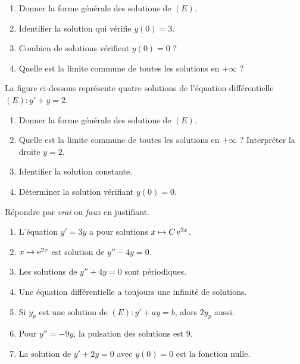 \begin{enumerate}
	\item Donner la forme générale des solutions de $(E)$.
	\item Identifier la solution qui vérifie $y(0)=3$.
	\item Combien de solutions vérifient $y(0)=0$ ?
	\item Quelle est la limite commune de toutes les solutions en $+\infty$ ?
\end{enumerate}

La figure ci-dessous représente quatre solutions de l'équation
différentielle $(E):y'+y=2$.

\begin{center}
\end{center}

\begin{enumerate}
	\item Donner la forme générale des solutions de $(E)$.
	\item Quelle est la limite commune de toutes les solutions en $+\infty$ ?
	Interpréter la droite $y=2$.
	\item Identifier la solution constante.
	\item Déterminer la solution vérifiant $y(0)=0$.
\end{enumerate}

Répondre par \emph{vrai} ou \emph{faux} en justifiant.
\begin{enumerate}
	\item L'équation $y'=3y$ a pour solutions $x\mapsto C\,\mathrm{e}^{3x}$.
	\item $x\mapsto \mathrm{e}^{2x}$ est solution de $y''-4y=0$.
	\item Les solutions de $y''+4y=0$ sont périodiques.
	\item Une équation différentielle a toujours une infinité de solutions.
	\item Si $y_p$ est une solution de $(E):y'+ay=b$, alors $2y_p$ aussi.
	\item Pour $y''=-9y$, la pulsation des solutions est $9$.
	\item La solution de $y'+2y=0$ avec $y(0)=0$ est la fonction nulle.
\end{enumerate}


